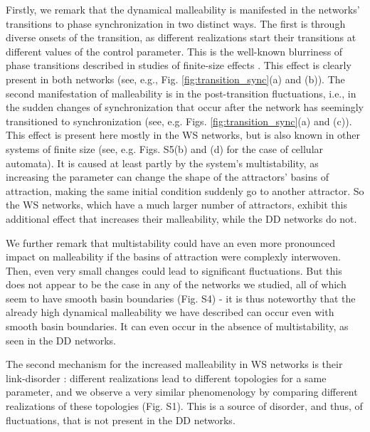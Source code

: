 Firstly, we remark that the dynamical malleability is manifested in the networks' transitions to phase synchronization in two distinct ways. The first is through diverse onsets of the transition, as different realizations start their transitions at different values of the control parameter. This is the well-known blurriness of phase transitions described in studies of finite-size effects \cite{brankov2000theory, binder1987finite}. This effect is clearly present in both networks (see, e.g., Fig. \ref{fig:transition_sync}(a) and (b)). The second manifestation of malleability is in the post-transition fluctuations, i.e., in the sudden changes of synchronization that occur after the network has seemingly transitioned to synchronization (see, e.g. Figs. \ref{fig:transition_sync}(a) and (c)). This effect is present here mostly in the WS networks, but is also known in other systems of finite size (see, e.g. Figs. S5(b) and (d) for the case of cellular automata). It is caused at least partly by the system's multistability, as increasing the parameter can change the shape of the attractors' basins of attraction, making the same initial condition suddenly go to another attractor. So the WS networks, which have a much larger number of attractors, exhibit this additional effect that increases their malleability, while the DD networks do not.

We further remark that multistability could have an even more pronounced impact on malleability if the basins of attraction were complexly interwoven. Then, even very small changes could lead to significant fluctuations. But this does not appear to be the case in any of the networks we studied, all of which seem to have smooth basin boundaries (Fig. S4) - it is thus noteworthy that the already high dynamical malleability we have described can occur even with smooth basin boundaries. It can even occur in the absence of multistability, as seen in the DD networks.

The second mechanism for the increased malleability in WS networks is their link-disorder \cite{hong2013link}: different realizations lead to different topologies for a same parameter, and we observe a very similar phenomenology by comparing different realizations of these topologies (Fig. S1). This is a source of disorder, and thus, of fluctuations, that is not present in the DD networks. 


